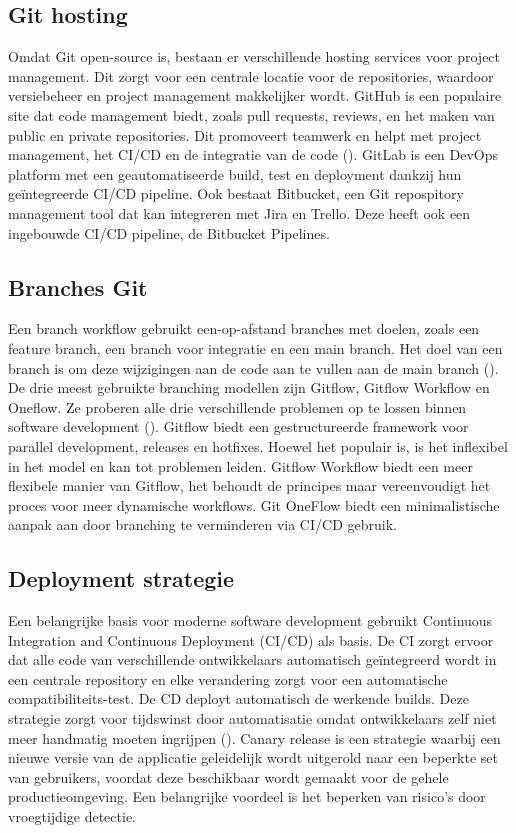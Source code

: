 \subsection{Git hosting}
Omdat Git open-source is, bestaan er verschillende hosting services voor project management. Dit zorgt voor een centrale locatie voor de repositories, waardoor versiebeheer en project management makkelijker wordt. GitHub is een populaire site dat code management biedt, zoals pull requests, reviews, en het maken van public en private repositories. Dit promoveert teamwerk en helpt met project management, het CI/CD en de integratie van de code (\cite{Ghodke2024}). GitLab is een DevOps platform met een geautomatiseerde build, test en deployment dankzij hun geïntegreerde CI/CD pipeline. Ook bestaat Bitbucket, een Git repospitory management tool dat kan integreren met Jira en Trello. Deze heeft ook een ingebouwde CI/CD pipeline, de Bitbucket Pipelines.

\subsection{Branches Git}
Een branch workflow gebruikt een-op-afstand branches met doelen, zoals een feature branch, een branch voor integratie en een main branch. Het doel van een branch is om deze wijzigingen aan de code aan te vullen aan de main branch (\cite{Lopes2025}).
De drie meest gebruikte branching modellen zijn Gitflow, Gitflow Workflow en Oneflow. Ze proberen alle drie verschillende problemen op te lossen binnen software development (\cite{Uppala2024}). Gitflow biedt een gestructureerde framework voor parallel development, releases en hotfixes. Hoewel het populair is, is het inflexibel in het model en kan tot problemen leiden. Gitflow Workflow biedt een meer flexibele manier van Gitflow, het behoudt de principes maar vereenvoudigt het proces voor meer dynamische workflows. Git OneFlow biedt een minimalistische aanpak aan door branching te verminderen via CI/CD gebruik.

\subsection{Deployment strategie}
Een belangrijke basis voor moderne software development gebruikt Continuous Integration and Continuous Deployment (CI/CD) als basis. De CI zorgt ervoor dat alle code van verschillende ontwikkelaars automatisch geïntegreerd wordt in een centrale repository en elke verandering zorgt voor een automatische compatibiliteits-test. De CD deployt automatisch de werkende builds. Deze strategie zorgt voor tijdswinst door automatisatie omdat ontwikkelaars zelf niet meer handmatig moeten ingrijpen (\cite{Gowda2022}). 
Canary release is een strategie waarbij een nieuwe versie van de applicatie geleidelijk wordt uitgerold naar een beperkte set van gebruikers, voordat deze beschikbaar wordt gemaakt voor de gehele productieomgeving. Een belangrijke voordeel is het beperken van risico's door vroegtijdige detectie.

